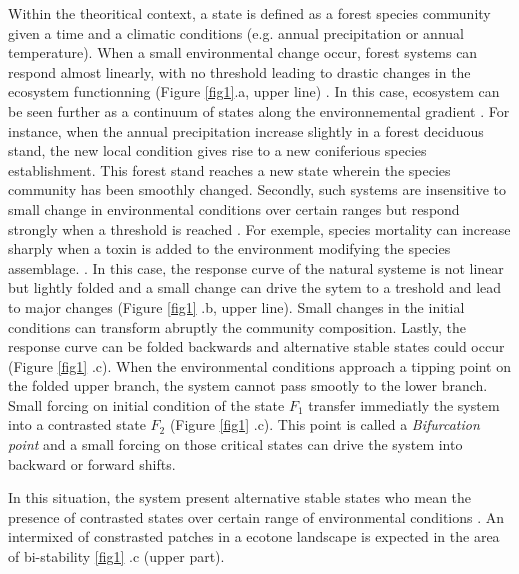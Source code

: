 Within the theoritical context, a state is defined as a forest species community
given a time and a climatic conditions (e.g. annual precipitation or annual
temperature). When a small environmental change occur, forest systems can
respond almost linearly, with no threshold leading to drastic changes in the
ecosystem functionning (Figure \ref{fig1}.a, upper line)
\cite{Scheffer2001,Scheffer2009}. In this case, ecosystem can be seen further
as a continuum of states along the environnemental gradient
\cite{Scheffer2001,Scheffer2009,scheffer2009critical}. For instance, when the
annual precipitation increase slightly in a forest deciduous stand, the new
local condition gives rise to a new coniferious species establishment. This
forest stand reaches a new state wherein the species community has been
smoothly changed. Secondly, such systems are insensitive to small change in
environmental conditions over certain ranges but respond strongly when a
threshold is reached \cite{scheffer2009critical}. For exemple, species
mortality can increase sharply when a toxin is added to the environment
modifying the species assemblage. \cite{scheffer2009critical}. In this case,
the response curve of the natural systeme is not linear but lightly folded and
a small change can drive the sytem to a treshold and lead to major changes
(Figure \ref{fig1} .b, upper line). Small changes in the initial conditions
can transform abruptly the community composition. Lastly, the response curve
can be folded backwards and alternative stable states could occur (Figure
\ref{fig1} .c). When the environmental conditions approach a tipping point on
the folded upper branch, the system cannot pass smootly to the lower branch.
Small forcing on initial condition of the state $F_1$ transfer immediatly the
system into a contrasted state $F_2$ (Figure \ref{fig1} .c). This point is
called a \textit{Bifurcation point} and a small forcing on those critical
states can drive the system into backward or forward shifts.


In this situation, the system present alternative stable states who mean the
presence of contrasted states over certain range of environmental conditions
\cite{scheffer2009critical}. An intermixed of constrasted patches in a ecotone
landscape is expected in the area of bi-stability \ref{fig1} .c (upper part).\\


